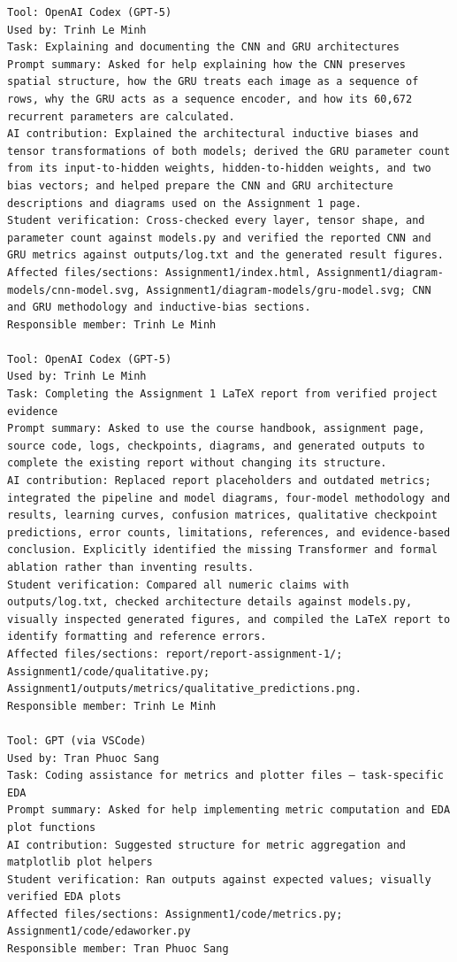 \begin{lstlisting}
Tool: OpenAI Codex (GPT-5)
Used by: Trinh Le Minh
Task: Explaining and documenting the CNN and GRU architectures
Prompt summary: Asked for help explaining how the CNN preserves spatial structure, how the GRU treats each image as a sequence of rows, why the GRU acts as a sequence encoder, and how its 60,672 recurrent parameters are calculated.
AI contribution: Explained the architectural inductive biases and tensor transformations of both models; derived the GRU parameter count from its input-to-hidden weights, hidden-to-hidden weights, and two bias vectors; and helped prepare the CNN and GRU architecture descriptions and diagrams used on the Assignment 1 page.
Student verification: Cross-checked every layer, tensor shape, and parameter count against models.py and verified the reported CNN and GRU metrics against outputs/log.txt and the generated result figures.
Affected files/sections: Assignment1/index.html, Assignment1/diagram-models/cnn-model.svg, Assignment1/diagram-models/gru-model.svg; CNN and GRU methodology and inductive-bias sections.
Responsible member: Trinh Le Minh

Tool: OpenAI Codex (GPT-5)
Used by: Trinh Le Minh
Task: Completing the Assignment 1 LaTeX report from verified project evidence
Prompt summary: Asked to use the course handbook, assignment page, source code, logs, checkpoints, diagrams, and generated outputs to complete the existing report without changing its structure.
AI contribution: Replaced report placeholders and outdated metrics; integrated the pipeline and model diagrams, four-model methodology and results, learning curves, confusion matrices, qualitative checkpoint predictions, error counts, limitations, references, and evidence-based conclusion. Explicitly identified the missing Transformer and formal ablation rather than inventing results.
Student verification: Compared all numeric claims with outputs/log.txt, checked architecture details against models.py, visually inspected generated figures, and compiled the LaTeX report to identify formatting and reference errors.
Affected files/sections: report/report-assignment-1/; Assignment1/code/qualitative.py; Assignment1/outputs/metrics/qualitative_predictions.png.
Responsible member: Trinh Le Minh

Tool: GPT (via VSCode)
Used by: Tran Phuoc Sang
Task: Coding assistance for metrics and plotter files — task-specific EDA
Prompt summary: Asked for help implementing metric computation and EDA plot functions
AI contribution: Suggested structure for metric aggregation and matplotlib plot helpers
Student verification: Ran outputs against expected values; visually verified EDA plots
Affected files/sections: Assignment1/code/metrics.py; Assignment1/code/edaworker.py
Responsible member: Tran Phuoc Sang


\end{lstlisting}
